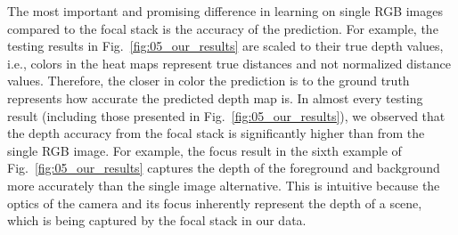 \documentclass[letterpaper, 10 pt, conference]{ieeeconf}  %
\begin{document}
The most important and promising difference in learning on single RGB images compared to the focal stack is the accuracy of the prediction. For example, the testing results in Fig.~\ref{fig:05_our_results} are scaled to their true depth values, i.e., colors in the heat maps represent true distances and not normalized distance values. Therefore, the closer in color the prediction is to the ground truth represents how accurate the predicted depth map is. In almost every testing result (including those presented in Fig.~\ref{fig:05_our_results}), we observed that the depth accuracy from the focal stack is significantly higher than from the single RGB image. For example, the focus result in the sixth example of Fig.~\ref{fig:05_our_results} captures the depth of the foreground and background more accurately than the single image alternative. This is intuitive because the optics of the camera and its focus inherently represent the depth of a scene, which is being captured by the focal stack in our data. 
\end{document}
